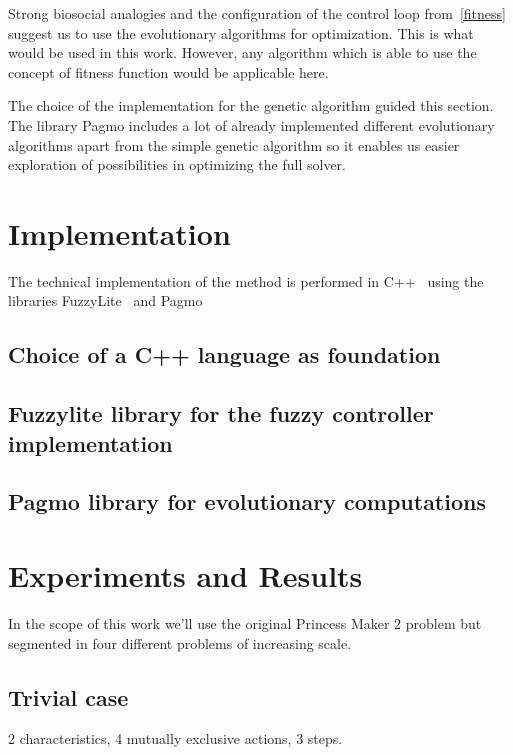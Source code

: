 \documentclass[11pt, a4paper]{article}
\begin{document}
	Strong biosocial analogies and the configuration of the control loop from~\ref{fitness} suggest us to use the evolutionary algorithms for optimization.
	This is what would be used in this work.
	However, any algorithm which is able to use the concept of fitness function would be applicable here.
	
	The choice of the implementation for the genetic algorithm guided this section.
	The library Pagmo \cite{Biscani2020} includes a lot of already implemented different evolutionary algorithms apart from the simple genetic algorithm so it enables us easier exploration of possibilities in optimizing the full solver.

	\section{Implementation}
	
	The technical implementation of the method is performed in C++~\cite{ppp3} using the libraries FuzzyLite~\cite{fl::fuzzylite} and Pagmo~\cite{Biscani2020}

	\subsection{Choice of a C++ language as foundation}
	
	\subsection{Fuzzylite library for the fuzzy controller implementation}
	
	\subsection{Pagmo library for evolutionary computations}
	
	\section{Experiments and Results}

	In the scope of this work we'll use the original Princess Maker 2 problem but segmented in four different problems of increasing scale.
	
	\subsection{Trivial case}

	2 characteristics, 4 mutually exclusive actions, 3 steps.
\end{document}
